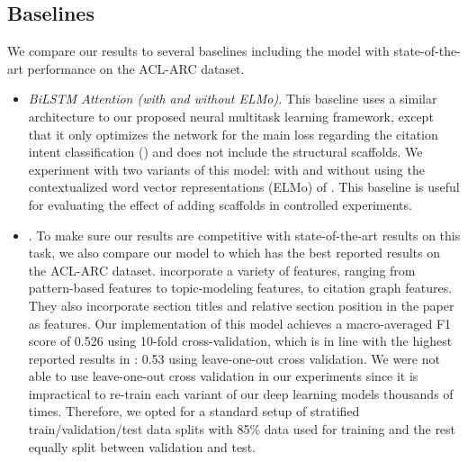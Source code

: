 \documentclass[11pt,a4paper]{article}
\newcommand{\acldata}{ACL-ARC\xspace}
\begin{document}
\subsection{Baselines}
\label{subsec:comparison}


We compare our results to several baselines including the model with state-of-the-art performance on the \acldata dataset.
\begin{itemize}[leftmargin=6pt]
\setlength\itemsep{6pt}

    \item \textit{BiLSTM Attention (with and without ELMo)}. This baseline uses a similar architecture to our proposed neural multitask learning framework, except that it only optimizes the network for the main loss regarding the citation intent classification () and does not include the structural scaffolds.
    We experiment with two variants of this model: with and without using the contextualized word vector representations (ELMo) of \citet{Peters2018DeepCW}.
    This baseline is useful for evaluating the effect of adding scaffolds in controlled experiments.

    \item \textit{\citet{jurgens2018}}. To make sure our results are competitive with state-of-the-art results on this task, we also compare our model to \citet{jurgens2018} which has the best reported results on the \acldata dataset. \citet{jurgens2018} incorporate a variety of features, ranging from pattern-based features to topic-modeling features, to citation graph features. They also incorporate section titles and relative section position in the paper as features.
    Our implementation of this model achieves a macro-averaged F1 score of 0.526 using 10-fold cross-validation, which is in line with the highest reported results in \citet{jurgens2018}: 0.53 using leave-one-out cross validation. We were not able to use leave-one-out cross validation in our experiments since it is impractical to re-train each variant of our deep learning models thousands of times. Therefore, we opted for a standard setup of stratified train/validation/test data splits with 85\% data used for training and the rest equally split between validation and test.

\end{itemize}
\end{document}

